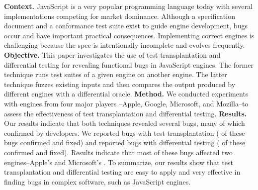 \textbf{Context.} 
JavaScript is a very popular programming language today with several
implementations competing for market dominance. Although a
specification document and a conformance test suite exist to guide
engine development, bugs occur and have important practical
consequences. Implementing correct
engines is challenging because the spec is intentionally
incomplete and evolves frequently.
\textbf{Objective.} 
This paper investigates the use of test transplantation and differential testing
for revealing functional bugs in JavaScript engines.
The former technique runs test suites of a given engine on another engine. 
The latter technique fuzzes existing inputs 
and then compares the output produced by different engines with a differential oracle.
\textbf{Method.} 
We conducted experiments with engines from four major players
--Apple, Google, Microsoft, and Mozilla--to assess the effectiveness of 
test transplantation and differential testing.
\textbf{Results.} 
Our results indicate that both techniques revealed several bugs, many of which
confirmed by developers. We reported \noBugsTransplantation{} bugs
with test transplantation (\noBugsTransplantationConfirmed{} of these bugs
confirmed and \noBugsTransplantationFixed{} fixed) and reported
\noBugsDifferentialTesting{} bugs with differential testing
(\noBugsDifferentialTestingConfirmed{} of these confirmed
and \noBugsDifferentialTestingFixed{} fixed). Results indicate that
most of these bugs affected two engines--Apple's
\jsc{} and Microsoft's \chakra{}. 
To summarize, our results show that
test transplantation and differential testing
are easy to apply and very effective in
finding bugs in complex software, such as JavaScript engines.
